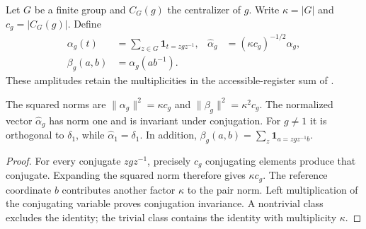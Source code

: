 \begin{definition}
    \label{def:peps_regular_flux_creation_vectors}
    \leanok
    Let $G$ be a finite group and $C_G(g)$ the centralizer of $g$.
    Write $\kappa=|G|$ and $c_g=|C_G(g)|$. Define
    \begin{align}
        \alpha_g(t)  & =\sum_{z\in G}\mathbf 1_{t=zgz^{-1}},
                     & \widehat\alpha_g                      & =(\kappa c_g)^{-1/2}\alpha_g, \\
        \beta_g(a,b) & =\alpha_g(ab^{-1}).
    \end{align}
    These amplitudes retain the multiplicities in the accessible-register sum
    of \cite[Theorem 6.17]{Schuch2010PEPS}.
\end{definition}

\begin{lemma}
    \label{thm:peps_regular_flux_creation_norm}
    \leanok
    The squared norms are $\|\alpha_g\|^2=\kappa c_g$ and
    $\|\beta_g\|^2=\kappa^2c_g$. The normalized vector $\widehat\alpha_g$
    has norm one and is invariant under conjugation. For $g\ne1$ it is
    orthogonal to $\delta_1$, while $\widehat\alpha_1=\delta_1$.
    In addition, $\beta_g(a,b)=\sum_z\mathbf 1_{a=zgz^{-1}b}$.
\end{lemma}
\begin{proof}\leanok
    For every conjugate $zgz^{-1}$, precisely $c_g$ conjugating elements
    produce that conjugate. Expanding the squared norm therefore gives
    $\kappa c_g$. The reference coordinate $b$ contributes another factor
    $\kappa$ to the pair norm. Left multiplication of the conjugating variable
    proves conjugation invariance. A nontrivial class excludes the identity;
    the trivial class contains the identity with multiplicity $\kappa$.
\end{proof}

